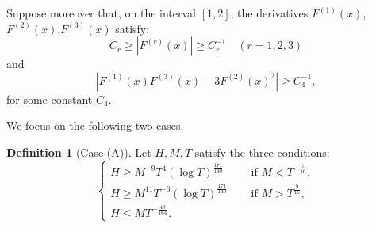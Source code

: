 \documentclass[11pt]{amsart}
\numberwithin{equation}{section}
\theoremstyle{definition}
\newtheorem{definition}{Definition}[section]
\theoremstyle{proposition}
\begin{document}
Suppose moreover that, on the interval $[1,2]$, the derivatives $F^{(1)}(x)$, \\ $F^{(2)}(x)$,$F^{(3)}(x)$ satisfy:
\begin{equation}  \label{condition on F 1}
C_r\ge |F^{(r)}(x)|\ge C_{r}^{-1}  \quad (r=1,2,3)    
\end{equation}
and  
\begin{equation}  \label{condition on F 2}
|F^{(1)}(x)F^{(3)}(x)-3F^{(2)}(x)^2|\ge C_{4}^{-1},     
\end{equation}
for some constant $C_4$.

We focus on the following two cases. 

\begin{definition}  [Case (A)] \label{case A definition}
Let $H,M,T$ satisfy the three conditions: 
\begin{equation}  \label{case A}
\begin{cases}
H\ge M^{-9}T^{4}(\log T)^{\frac{171}{140}}  \quad  &\text{ if }M<T^{-\frac{7}{16}},
\\ H\ge M^{11}T^{-6}(\log T)^{\frac{171}{140}}  \quad &\text{ if }M>T^{\frac{9}{16}}, 
\\ H \le MT^{-\frac{49}{164}}.    &
\end{cases}    
\end{equation}    
\end{definition}  
\end{document}
